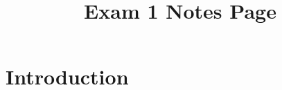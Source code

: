 \documentclass{article}
\title{Exam 1 Notes Page}
\author{}
\date{}
\begin{document}
\maketitle

\section{Introduction}
\end{document}
